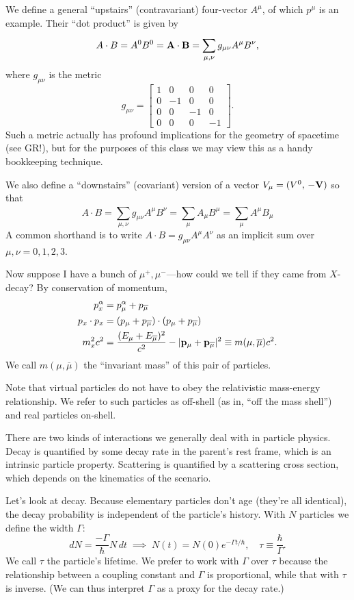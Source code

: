 \documentclass[../p164main.tex]{subfiles}
\begin{document}
We define a general ``upstairs'' (contravariant) four-vector $A^\mu$, of which $p^\mu$ is an example.   %
Their ``dot product'' is given by
\[ A \cdot B = A^0 B^0 = \mathbf{A} \cdot \mathbf{B} = \sum_{\mu,\nu}^{} g_{\mu\nu} A^\mu B^\nu, \]
where $g_{\mu\nu}$ is the metric
\[ g_{\mu\nu} = \begin{bmatrix} 1 & 0 & 0 & 0 \\ 0 & -1 & 0 & 0 \\ 0 & 0 & -1 & 0 \\ 0 & 0 & 0 & -1 \end{bmatrix}. \]
Such a metric actually has profound implications for the geometry of spacetime (see GR!), but for the purposes of this class we may view this as a handy bookkeeping technique.

We also define a ``downstairs'' (covariant) version of a vector $V_\mu = (V^0, \, -\mathbf{V})$ so that
\[ A \cdot B = \sum_{\mu,\nu}^{} g_{\mu\nu} A^\mu B^\nu = \sum_{\mu}^{} A_\mu B^\mu = \sum_{\mu}^{} A^\mu B_\mu \]  %
A common shorthand is to write $A \cdot B = g_{\mu\nu} A^\mu A^\nu$ as an implicit sum over $\mu,\nu = 0,1,2,3$.

Now suppose I have a bunch of $\mu^+, \mu^-$---how could we tell if they came from $X$-decay?
By conservation of momentum,
\begin{align*}
    p_x^\alpha &= p_\mu^\alpha + p_{\overline \mu} \\
    p_x \cdot p_x &= (p_\mu + p_{\overline \mu}) \cdot (p_\mu + p_{\overline \mu}) \\
    m_x^2 c^2 &= \frac{(E_\mu + E_{\overline \mu})^2}{c^2} - |\mathbf{p}_\mu + \mathbf{p}_{\overline \mu}|^2 \equiv m(\mu, \overline \mu) c^2.
\end{align*}
We call $m(\mu, \overline \mu)$ the ``invariant mass'' of this pair of particles.   %

Note that virtual particles do not have to obey the relativistic mass-energy relationship.
We refer to such particles as off-shell (as in, ``off the mass shell'') and real particles on-shell.

There are two kinds of interactions we generally deal with in particle physics.
Decay is quantified by some decay rate in the parent's rest frame, which is an intrinsic particle property.
Scattering is quantified by a scattering cross section, which depends on the kinematics of the scenario.

Let's look at decay.
Because elementary particles don't age (they're all identical), the decay probability is independent of the particle's history.
With $N$ particles we define the width $\Gamma$:
\[ dN = \frac{-\Gamma}{\hbar} N \,dt \;\implies\; N(t) = N(0) e^{-\Gamma t / \hbar}, \quad \tau \equiv \frac{\hbar}{\Gamma}. \]
We call $\tau$ the particle's lifetime.
We prefer to work with $\Gamma$ over $\tau$ because the relationship between a coupling constant and $\Gamma$ is proportional, while that with $\tau$ is inverse.
(We can thus interpret $\Gamma$ as a proxy for the decay rate.)
\end{document}
